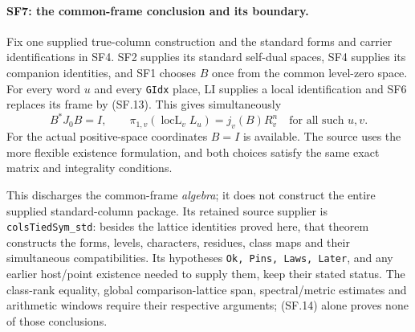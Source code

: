 \paragraph{SF7: the common-frame conclusion and its boundary.}
Fix one supplied true-column construction and the standard forms and
carrier identifications in SF4. SF2 supplies its standard self-dual
spaces, SF4 supplies its companion identities, and SF1 chooses $B$
once from the common level-zero space. For every word $u$ and every
\texttt{GIdx} place, LI supplies a local identification and SF6 replaces
its frame by (SF.13). This gives simultaneously
\[
 B^*J_0B=I,\qquad
 \pi_{1,v}(\operatorname{locL}_v L_u)=j_v(B)R_v^n
 \quad\text{for all such }u,v.                          \tag{SF.14}
\]
For the actual positive-space coordinates $B=I$ is available. The source
uses the more flexible existence formulation, and both choices satisfy
the same exact matrix and integrality conditions.

This discharges the common-frame \emph{algebra}; it does not construct
the entire supplied standard-column package. Its retained source supplier
is \texttt{colsTiedSym\_std}: besides the lattice identities proved here,
that theorem constructs the forms, levels, characters, residues, class
maps and their simultaneous compatibilities. Its hypotheses
\texttt{Ok, Pins, Laws, Later}, and any earlier host/point existence
needed to supply them, keep their stated status. The class-rank equality,
global comparison-lattice span, spectral/metric estimates and arithmetic
windows require their respective arguments; (SF.14) alone proves none
of those conclusions.
